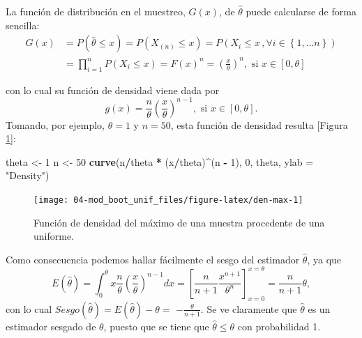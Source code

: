 \documentclass[]{book}
\newenvironment{Shaded}{\begin{snugshade}}{\end{snugshade}}
\newcommand{\KeywordTok}[1]{\textcolor[rgb]{0.13,0.29,0.53}{\textbf{#1}}}
\newcommand{\DataTypeTok}[1]{\textcolor[rgb]{0.13,0.29,0.53}{#1}}
\newcommand{\DecValTok}[1]{\textcolor[rgb]{0.00,0.00,0.81}{#1}}
\newcommand{\StringTok}[1]{\textcolor[rgb]{0.31,0.60,0.02}{#1}}
\newcommand{\OperatorTok}[1]{\textcolor[rgb]{0.81,0.36,0.00}{\textbf{#1}}}
\newcommand{\NormalTok}[1]{#1}
\theoremstyle{definition}
\theoremstyle{definition}
\theoremstyle{definition}
\theoremstyle{remark}
\begin{document}
La función de distribución en el muestreo, \(G\left( x \right)\), de
\(\hat{\theta}\) puede calcularse de forma sencilla:\[\begin{aligned}
G\left( x \right) &= P\left( \hat{\theta}\leq x \right) =P\left( X_{\left(
n \right)}\leq x \right) =P\left( X_i\leq x\,,\forall i\in \left\{ 1,\ldots
n\right\} \right) \\
&= \prod_{i=1}^{n}P\left( X_i\leq x \right) =F\left( x \right)^{n}=\left( 
\frac{x}{\theta } \right)^{n},\text{ si }x\in \left[ 0,\theta \right]\end{aligned}\]

con lo cual su función de densidad viene dada por
\[g\left( x \right) =\frac{n}{\theta }\left( \frac{x}{\theta } \right)^{n-1},
\text{ si }x\in \left[ 0,\theta \right] .\] Tomando, por ejemplo,
\(\theta =1\) y \(n=50\), esta función de densidad resulta {[}Figura
\ref{fig:den-max}{]}:

\begin{Shaded}
\begin{Highlighting}[]
\NormalTok{theta <-}\StringTok{ }\DecValTok{1}
\NormalTok{n <-}\StringTok{ }\DecValTok{50}
\KeywordTok{curve}\NormalTok{(n}\OperatorTok{/}\NormalTok{theta }\OperatorTok{*}\StringTok{ }\NormalTok{(x}\OperatorTok{/}\NormalTok{theta)}\OperatorTok{^}\NormalTok{(n }\OperatorTok{-}\StringTok{ }\DecValTok{1}\NormalTok{), }\DecValTok{0}\NormalTok{, theta, }\DataTypeTok{ylab =} \StringTok{"Density"}\NormalTok{)}
\end{Highlighting}
\end{Shaded}

\begin{figure}[!htb]

{\centering \texttt{[image: 04-mod\_boot\_unif\_files/figure-latex/den-max-1]} 

}

\caption{Función de densidad del máximo de una muestra procedente de una uniforme.}\label{fig:den-max}
\end{figure}

Como consecuencia podemos hallar fácilmente el sesgo del estimador
\(\hat{\theta}\), ya que
\[E\left( \hat{\theta} \right) =\int_{0}^{\theta }x\frac{n}{\theta }\left( 
\frac{x}{\theta } \right)^{n-1}dx=\left[ \frac{n}{n+1}\frac{x^{n+1}}{\theta
^{n}}\right] _{x=0}^{x=\theta }=\frac{n}{n+1}\theta ,\] con lo cual
\(Sesgo\left( \hat{\theta} \right) =E\left( \hat{\theta} \right) -\theta =\)
\(-\frac{\theta }{n+1}\). Se ve claramente que \(\hat{\theta}\) es un
estimador sesgado de \(\theta\), puesto que se tiene que
\(\hat{\theta}\leq \theta\) con probabilidad 1.
\end{document}
